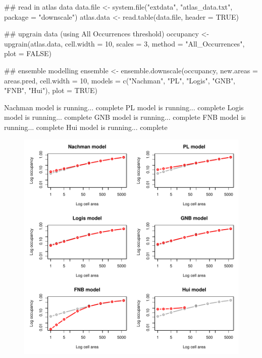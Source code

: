 \documentclass{article}[12pt, a4paper]
\begin{document}
\begin{Schunk}
\begin{Sinput}
## read in atlas data
data.file <- system.file("extdata", "atlas_data.txt", package = "downscale")
atlas.data <- read.table(data.file, header = TRUE)
\end{Sinput}
\end{Schunk}
\begin{Schunk}
\begin{Sinput}
## upgrain data (using All Occurrences threshold)
occupancy <- upgrain(atlas.data,
                     cell.width = 10,
                     scales = 3,
                     method = "All_Occurrences",
                     plot = FALSE)

## ensemble modelling
ensemble <- ensemble.downscale(occupancy,
                               new.areas = areas.pred,
                               cell.width = 10,
                               models = c("Nachman",
                                          "PL",
                                          "Logis",
                                          "GNB",
                                          "FNB",
                                          "Hui"),
                              plot = TRUE)
\end{Sinput}
\begin{Soutput}
Nachman model is running...  complete 
PL model is running...  complete 
Logis model is running...  complete 
GNB model is running...  complete 
FNB model is running...  complete 
Hui model is running...  complete 
\end{Soutput}
\end{Schunk}

\begin{figure}[!ht]
\centering
\includegraphics[width=13cm]{Downscaling-downscale23}
\end{figure}
\end{document}
